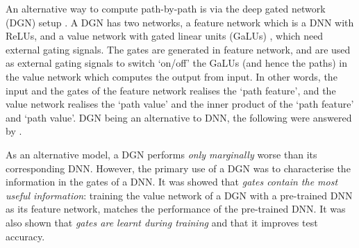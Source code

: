 An alternative way to compute path-by-path  is via the deep gated network (DGN) setup \citep{npk}. A DGN has two networks, a feature network which is a DNN with ReLUs, and a value network with gated linear units (GaLUs) \citep{sss}, which need external gating signals. The gates are generated in feature network, and are used as external gating signals to switch `on/off' the GaLUs (and hence the paths) in the value network  which computes the output from input. In other words, the input and the gates of the feature network realises the `path feature', and the value network realises the `path value' and the inner product of the `path feature' and `path value'. DGN being an alternative to DNN, the following were answered by \cite{npk}.

As an alternative model, a DGN performs \emph{only marginally} worse than its corresponding DNN. However, the primary use of a DGN was to characterise the information in the gates of a DNN. It was showed that \emph{gates contain the most useful information}: training the value network of a DGN with a pre-trained DNN as its feature network, matches the performance of the pre-trained DNN. It was also shown that \emph{gates are learnt during training} and that it improves test accuracy.






